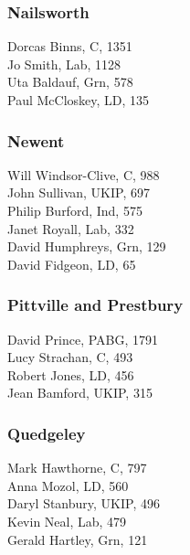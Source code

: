 \documentclass[a4paper,openany,10pt]{book}
\begin{document}
\subsubsection*{Nailsworth}



Dorcas Binns, C, 1351\\
Jo Smith, Lab, 1128\\
Uta Baldauf, Grn, 578\\
Paul McCloskey, LD, 135\\


\subsubsection*{Newent}



Will Windsor-Clive, C, 988\\
John Sullivan, UKIP, 697\\
Philip Burford, Ind, 575\\
Janet Royall, Lab, 332\\
David Humphreys, Grn, 129\\
David Fidgeon, LD, 65\\


\subsubsection*{Pittville and Prestbury}



David Prince, PABG, 1791\\
Lucy Strachan, C, 493\\
Robert Jones, LD, 456\\
Jean Bamford, UKIP, 315\\


\subsubsection*{Quedgeley}



Mark Hawthorne, C, 797\\
Anna Mozol, LD, 560\\
Daryl Stanbury, UKIP, 496\\
Kevin Neal, Lab, 479\\
Gerald Hartley, Grn, 121\\
\end{document}
